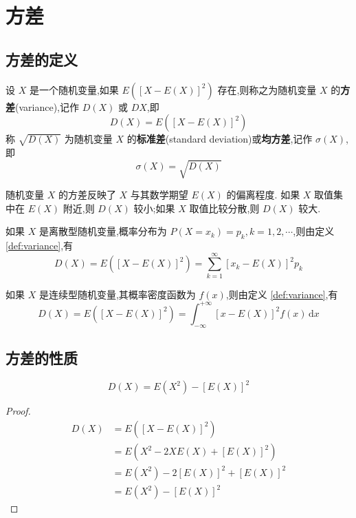 \section{方差}

\subsection{方差的定义}

\begin{definition}
    \indent 设 $X$ 是一个随机变量,如果 $E([X-E(X)]^2)$ 存在,则称之为随机变量 $X$ 的\textbf{方差}(variance),记作 $D(X)$ 或 $DX$,即
    $$
    D(X) = E([X-E(X)]^2)
    $$
    称 $\sqrt{D(X)}$ 为随机变量 $X$ 的\textbf{标准差}(standard deviation)或\textbf{均方差},记作 $\sigma(X)$,即
    $$
    \sigma(X) = \sqrt{D(X)}
    $$
\end{definition}

随机变量 $X$ 的方差反映了 $X$ 与其数学期望 $E(X)$ 的偏离程度. 如果 $X$ 取值集中在 $E(X)$ 附近,则 $D(X)$ 较小;如果 $X$ 取值比较分散,则 $D(X)$ 较大.

如果 $X$ 是离散型随机变量,概率分布为 $P(X=x_k) = p_k, k=1,2,\cdots$,则由定义 \ref{def:variance},有
$$
D(X) = E([X-E(X)]^2) = \sum_{k=1}^{\infty} [x_k - E(X)]^2 p_k
$$

如果 $X$ 是连续型随机变量,其概率密度函数为 $f(x)$,则由定义 \ref{def:variance},有
$$
D(X) = E([X-E(X)]^2) = \int_{-\infty}^{+\infty} [x - E(X)]^2 f(x) \, \text{d}x
$$

\subsection{方差的性质}

\begin{property}
    \begin{equation}
        D(X) = E(X^2) - [E(X)]^2
    \end{equation}
\end{property}

\begin{proof}
    $$
    \begin{aligned}
        D(X) &= E([X-E(X)]^2) \\
        &= E(X^2 - 2XE(X) + [E(X)]^2) \\
        &= E(X^2) - 2[E(X)]^2 + [E(X)]^2 \\
        &= E(X^2) - [E(X)]^2
    \end{aligned}
    $$
\end{proof}

